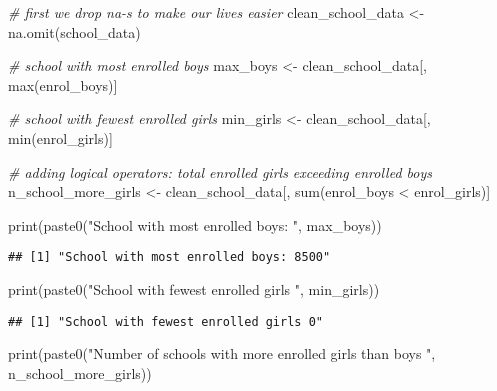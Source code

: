 \documentclass[
]{article}
\newenvironment{Shaded}{\begin{snugshade}}{\end{snugshade}}
\newcommand{\CommentTok}[1]{\textcolor[rgb]{0.56,0.35,0.01}{\textit{#1}}}
\newcommand{\FunctionTok}[1]{\textcolor[rgb]{0.00,0.00,0.00}{#1}}
\newcommand{\NormalTok}[1]{#1}
\newcommand{\OtherTok}[1]{\textcolor[rgb]{0.56,0.35,0.01}{#1}}
\newcommand{\SpecialCharTok}[1]{\textcolor[rgb]{0.00,0.00,0.00}{#1}}
\newcommand{\StringTok}[1]{\textcolor[rgb]{0.31,0.60,0.02}{#1}}
\begin{document}
\begin{Shaded}
\begin{Highlighting}[]
\CommentTok{\# first we drop na{-}s to make our lives easier}
\NormalTok{clean\_school\_data }\OtherTok{\textless{}{-}} \FunctionTok{na.omit}\NormalTok{(school\_data)}

\CommentTok{\# school with most enrolled boys}
\NormalTok{max\_boys }\OtherTok{\textless{}{-}}\NormalTok{ clean\_school\_data[, }\FunctionTok{max}\NormalTok{(enrol\_boys)]}

\CommentTok{\# school with fewest enrolled girls }
\NormalTok{min\_girls }\OtherTok{\textless{}{-}}\NormalTok{ clean\_school\_data[, }\FunctionTok{min}\NormalTok{(enrol\_girls)]}

\CommentTok{\# adding logical operators: total enrolled girls exceeding enrolled boys}
\NormalTok{n\_school\_more\_girls }\OtherTok{\textless{}{-}}\NormalTok{ clean\_school\_data[, }\FunctionTok{sum}\NormalTok{(enrol\_boys }\SpecialCharTok{\textless{}}\NormalTok{ enrol\_girls)]}

\FunctionTok{print}\NormalTok{(}\FunctionTok{paste0}\NormalTok{(}\StringTok{"School with most enrolled boys: "}\NormalTok{, max\_boys))}
\end{Highlighting}
\end{Shaded}

\begin{verbatim}
## [1] "School with most enrolled boys: 8500"
\end{verbatim}

\begin{Shaded}
\begin{Highlighting}[]
\FunctionTok{print}\NormalTok{(}\FunctionTok{paste0}\NormalTok{(}\StringTok{"School with fewest enrolled girls "}\NormalTok{, min\_girls))}
\end{Highlighting}
\end{Shaded}

\begin{verbatim}
## [1] "School with fewest enrolled girls 0"
\end{verbatim}

\begin{Shaded}
\begin{Highlighting}[]
\FunctionTok{print}\NormalTok{(}\FunctionTok{paste0}\NormalTok{(}\StringTok{"Number of schools with more enrolled girls than boys "}\NormalTok{, n\_school\_more\_girls))}
\end{Highlighting}
\end{Shaded}
\end{document}

